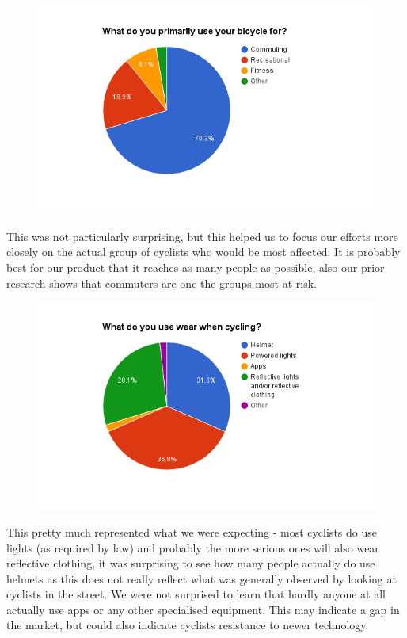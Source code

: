 \documentclass[a4paper]{report}
\begin{document}
{\begin{figure}[H]
\centering
\includegraphics[scale=0.6]{figures/research_report/questionnaires/drivers_7}
\end{figure}
This was not particularly surprising, but this helped us to focus our efforts more closely on the actual group of cyclists who would be most affected. It is probably best for our product that it reaches as many people as possible, also our prior research shows that commuters are one the groups most at risk.
\begin{figure}[H]
\centering
\includegraphics[scale=0.6]{figures/research_report/questionnaires/drivers_8}
\end{figure}
This pretty much represented what we were expecting  - most cyclists do use lights (as required by law) and probably the more serious ones will also wear reflective clothing, it was surprising to see how many people actually do use helmets as this does not really reflect what was generally observed by looking at cyclists in the street. We were not surprised to learn that hardly anyone at all actually use apps or any other specialised equipment. 
This may indicate a gap in the market, but could also indicate cyclists resistance to newer technology.
}
\end{document}
